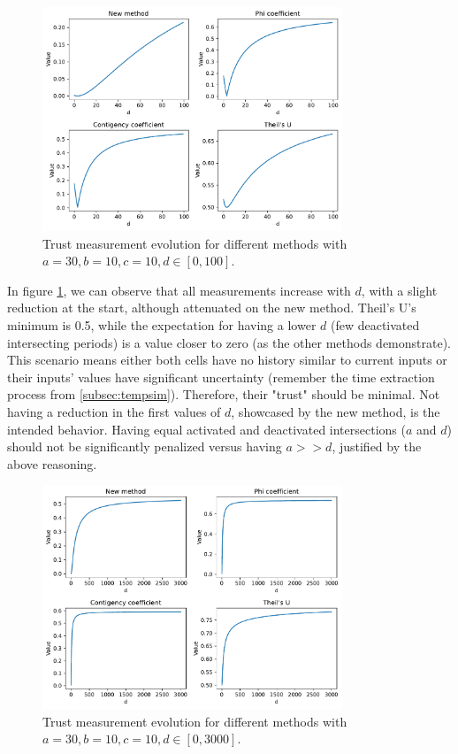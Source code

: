 \begin{figure}[h!]
\centering
    \includegraphics[width=0.8\textwidth]{figures/chapter4/cell/trust_tests/1_a.pdf}
    \caption{Trust measurement evolution for different methods with $a=30, b=10, c=10, d \in [0, 100]$.}
    \label{fig:trust_test_1_a}
\end{figure}
\FloatBarrier


In figure \ref{fig:trust_test_1_a}, we can observe that all measurements increase with $d$, with a slight reduction at the start, although attenuated on the new method. Theil's U's minimum is 0.5, while the expectation for having a lower $d$ (few deactivated intersecting periods) is a value closer to zero (as the other methods demonstrate). This scenario means either both cells have no history similar to current inputs or their inputs' values have significant uncertainty (remember the time extraction process from \ref{subsec:tempsim}). Therefore, their "trust" should be minimal.
Not having a reduction in the first values of $d$, showcased by the new method, is the intended behavior. Having equal activated and deactivated intersections ($a$ and $d$) should not be significantly penalized versus having $a>>d$, justified by the above reasoning.

\begin{figure}[h!]
\centering
    \includegraphics[width=0.8\textwidth]{figures/chapter4/cell/trust_tests/1_b.pdf}
    \caption{Trust measurement evolution for different methods with $a=30, b=10, c=10, d \in [0, 3000]$.}
    \label{fig:trust_test_1_b}
\end{figure}
\FloatBarrier

